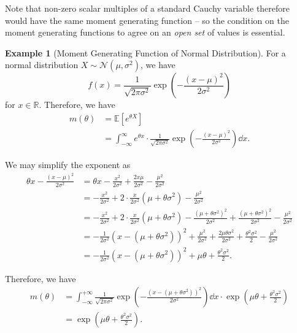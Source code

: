 \documentclass[11pt]{article}
\numberwithin{equation}{section}
\theoremstyle{definition}
\newtheorem{example}[theorem]{Example}
\theoremstyle{remark}
\newcommand{\pqty}[1]{\left(#1\right)}
\newcommand{\bqty}[1]{\left[#1\right]}
\newcommand{\RR}{\mathbb R}
\newcommand{\plusinfty}{+\infty}
\newcommand{\minusinfty}{-\infty}
\newcommand{\Expt}{\mathbb E}
\newcommand{\Normal}{\mathcal N}
\begin{document}
Note that non-zero scalar multiples of a standard Cauchy variable therefore would have the same moment generating function -- so the condition on the moment generating functions to agree on an \emph{open set} of values is essential.

\begin{example}[Moment Generating Function of Normal Distribution]\label{probability-example-043}
    \label{probability-ex:mgf-normal}%
    For a normal distribution \(X \sim \Normal\pqty{\mu, \sigma^2}\), we have
    \[
        f\pqty{x} = \frac{1}{\sqrt{2 \pi \sigma^2}} \exp\pqty{- \frac{\pqty{x - \mu}^2}{2 \sigma^2}}
    \]
    for \(x \in \RR\). Therefore, we have
    \begin{align*}
        m\pqty{\theta} &= \Expt\bqty{e^{\theta X}} \\
        &= \int_{\minusinfty}^{\infty} e^{\theta x} \cdot \frac{1}{\sqrt{2 \pi \sigma^2}} \exp\pqty{- \frac{\pqty{x - \mu}^2}{2 \sigma^2}} \dd{x}.
    \end{align*}

    We may simplify the exponent as
    \begin{align*}
        \theta x - \frac{\pqty{x - \mu}^2}{2 \sigma^2} &= \theta x - \frac{x^2}{2 \sigma^2} + \frac{2 x \mu}{2 \sigma^2} - \frac{\mu^2}{2 \sigma^2} \\
        &= - \frac{x^2}{2 \sigma^2} + 2 \cdot \frac{x}{2 \sigma^2} \pqty{\mu + \theta \sigma^2} - \frac{\mu^2}{2 \sigma^2} \\
        &= - \frac{x^2}{2 \sigma^2} + 2 \cdot \frac{x}{2 \sigma^2} \pqty{\mu + \theta \sigma^2} - \frac{\pqty{\mu + \theta \sigma^2}^2}{2 \sigma^2} + \frac{\pqty{\mu + \theta \sigma^2}^2}{2 \sigma^2} - \frac{\mu^2}{2 \sigma^2} \\
        &= - \frac{1}{2 \sigma^2} \pqty{x - \pqty{\mu + \theta \sigma^2}}^2 + \frac{\mu^2}{2 \sigma^2} + \frac{2 \mu \theta \sigma^2}{2 \sigma^2} + \frac{\theta^2 \sigma^2}{2} - \frac{\mu^2}{2 \sigma^2} \\
        &= - \frac{1}{2 \sigma^2} \pqty{x - \pqty{\mu + \theta \sigma^2}}^2 + \mu \theta + \frac{\theta^2 \sigma^2}{2}.
    \end{align*}

    Therefore, we have
    \begin{align*}
        m\pqty{\theta} &= \int_{\minusinfty}^{\plusinfty} \frac{1}{\sqrt{2 \pi \sigma^2}} \exp\pqty{- \frac{\pqty{x - \pqty{\mu + \theta \sigma^2}}^2}{2 \sigma^2}} \dd{x}  \cdot \exp \pqty{\mu \theta + \frac{\theta^2 \sigma^2}{2}} \\
        &= \exp\pqty{\mu \theta + \frac{\theta^2 \sigma^2}{2}}.
    \end{align*}


\end{example}
\end{document}
